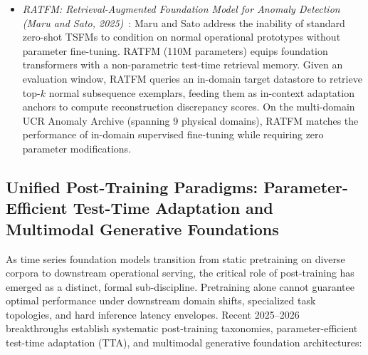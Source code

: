 \begin{itemize}[leftmargin=*]
    \item \emph{RATFM: Retrieval-Augmented Foundation Model for Anomaly Detection (Maru and Sato, 2025)}~\cite{maru2025ratfm}: Maru and Sato address the inability of standard zero-shot TSFMs to condition on normal operational prototypes without parameter fine-tuning. RATFM (110M parameters) equips foundation transformers with a non-parametric test-time retrieval memory. Given an evaluation window, RATFM queries an in-domain target datastore to retrieve top-$k$ normal subsequence exemplars, feeding them as in-context adaptation anchors to compute reconstruction discrepancy scores. On the multi-domain UCR Anomaly Archive (spanning 9 physical domains), RATFM matches the performance of in-domain supervised fine-tuning while requiring zero parameter modifications.
\end{itemize}

\subsection{Unified Post-Training Paradigms: Parameter-Efficient Test-Time Adaptation and Multimodal Generative Foundations}
\label{sec:posttraining_petsa_aurora}

As time series foundation models transition from static pretraining on diverse corpora to downstream operational serving, the critical role of post-training has emerged as a distinct, formal sub-discipline. Pretraining alone cannot guarantee optimal performance under downstream domain shifts, specialized task topologies, and hard inference latency envelopes. Recent 2025--2026 breakthroughs establish systematic post-training taxonomies, parameter-efficient test-time adaptation (TTA), and multimodal generative foundation architectures:

